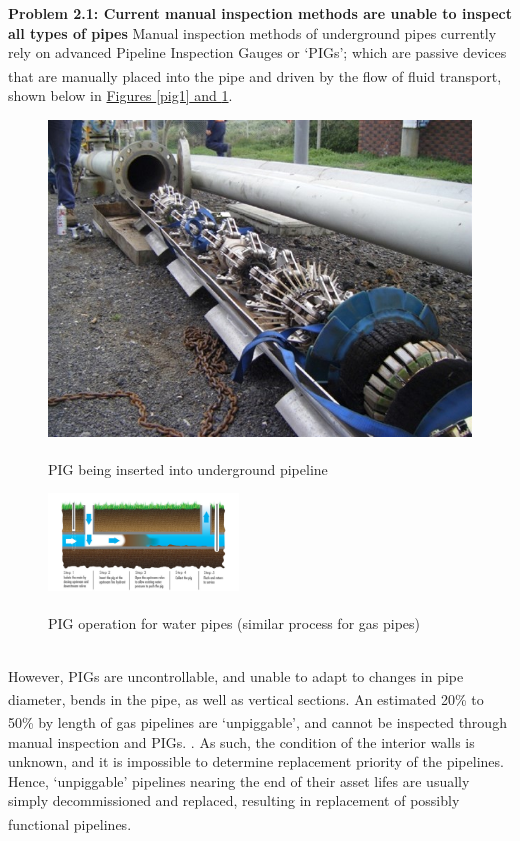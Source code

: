 \documentclass[11pt]{article}		%
\newlength{\imageheight}	 %
\newcommand{\supercite}[1]{\textsuperscript{\cite{#1}}}		%
\begin{document}
	\textbf{Problem 2.1: Current manual inspection methods are unable to inspect all types of pipes }
	Manual inspection methods of underground pipes currently rely on advanced Pipeline Inspection Gauges or ‘PIGs’; which are passive devices that are manually placed into the pipe and driven by the flow of fluid transport\supercite{sönnichsen_5_2021}, shown below in \hyperref[pig1]{Figures \ref*{pig1} and \ref*{pig2}}.
		\begin{figure}[h]
					\centering
					\begin{multicols}{2}
						\includegraphics[height=\imageheight]{pig1.jpg}
						\caption{PIG being inserted into underground pipeline\supercite{sönnichsen_5_2021}}
						\label{pig1}
						\columnbreak
						\includegraphics[width=0.45\textwidth]{pig2.jpg}
						\caption{PIG operation for water pipes (similar process for gas pipes)\supercite{sönnichsen_5_2021}}
						\label{pig2}
					\end{multicols}
				\end{figure}
		\vspace{-0.5cm}
    \\  However, PIGs are uncontrollable, and unable to adapt to changes in pipe diameter, bends in the pipe, as well as vertical sections\supercite{sönnichsen_5_2021}. An estimated 20\% to 50\% by length of gas pipelines are ‘unpiggable’\supercite{sönnichsen_5_2021}, and cannot be inspected through manual inspection and PIGs. . As such, the condition of the interior walls is unknown, and it is impossible to determine replacement priority of the pipelines. 
    \\ \hspace*{3ex} Hence, ‘unpiggable’ pipelines nearing the end of their asset lifes are usually simply decommissioned and replaced, resulting in replacement of possibly functional pipelines\supercite{sönnichsen_5_2021}.
    
\end{document}
